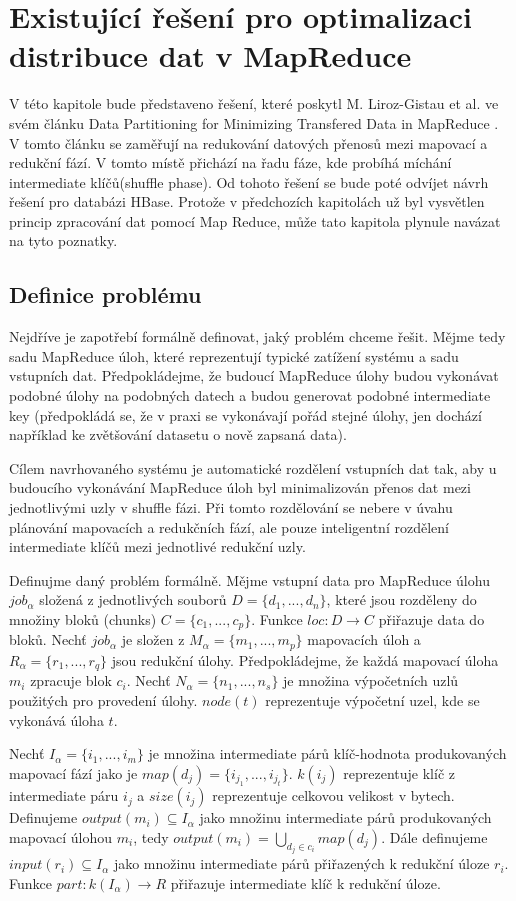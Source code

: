 \documentclass[thesis=M,czech]{FITthesis}[2012/06/26]
\begin{document}
\chapter{Existující řešení pro optimalizaci distribuce dat v MapReduce}
V této kapitole bude představeno řešení, které poskytl M. Liroz-Gistau et al. ve svém článku Data Partitioning for Minimizing Transfered Data in MapReduce \cite{gistau}. V tomto článku se zaměřují na redukování datových přenosů mezi mapovací a redukční fází. V tomto místě přichází na řadu fáze, kde probíhá míchání intermediate klíčů(shuffle phase). Od tohoto řešení se bude poté odvíjet návrh řešení pro databázi HBase. Protože v předchozích kapitolách už byl vysvětlen princip zpracování dat pomocí Map Reduce, může tato kapitola plynule navázat na tyto poznatky. 

\section{Definice problému}
Nejdříve je zapotřebí formálně definovat, jaký problém chceme řešit. Mějme tedy sadu MapReduce úloh, které reprezentují typické zatížení systému a sadu vstupních dat. Předpokládejme, že budoucí MapReduce úlohy budou vykonávat podobné úlohy na podobných datech a budou generovat podobné intermediate key (předpokládá se, že v praxi se vykonávají pořád stejné úlohy, jen dochází například ke zvětšování datasetu o nově zapsaná data). 

Cílem navrhovaného systému je automatické rozdělení vstupních dat tak, aby u budoucího vykonávání MapReduce úloh byl minimalizován přenos dat mezi jednotlivými uzly v shuffle fázi. Při tomto rozdělování se nebere v úvahu plánování mapovacích a redukčních fází, ale pouze inteligentní rozdělení intermediate klíčů mezi jednotlivé redukční uzly.

	Definujme daný problém formálně. Mějme vstupní data pro MapReduce úlohu $job_\alpha$ složená z jednotlivých souborů $D = \{d_1, ..., d_n\}$, které jsou rozděleny do  množiny bloků (chunks) $C = \{c_1, ..., c_p\}$. Funkce $loc : D \rightarrow C$ přiřazuje data do bloků. Nechť  $job_\alpha$ je složen z $M_\alpha = \{m_1, ..., m_p\}$ mapovacích úloh a $R_\alpha = \{r_1, ..., r_q\}$ jsou redukční úlohy. Předpokládejme, že každá mapovací úloha $m_i$ zpracuje blok $c_i$. Nechť  $N_\alpha = \{n_1, ..., n_s\}$ je množina výpočetních uzlů použitých pro provedení úlohy. $node(t)$ reprezentuje výpočetní uzel, kde se vykonává úloha $t$.

Nechť $I_\alpha = \{i_1, ..., i_m\}$ je množina intermediate párů klíč-hodnota produkovaných mapovací fází jako je $map(d_j) = \{i_{j_1}, ..., i_{j_t}\}$. $k(i_j)$ reprezentuje klíč z intermediate páru $i_j$ a $size(i_j)$ reprezentuje celkovou velikost v bytech. Definujeme $output(m_i) \subseteq I_\alpha$ jako množinu intermediate párů produkovaných mapovací úlohou $m_i$, tedy $output(m_i) = \bigcup_{{d_j}\in{c_i}} map(d_j)$. Dále definujeme $input(r_i)\subseteq I_\alpha$ jako množinu intermediate párů přiřazených k redukční úloze $r_i$. Funkce $part : k(I_\alpha) \rightarrow R$ přiřazuje intermediate klíč k redukční úloze. 
\end{document}
